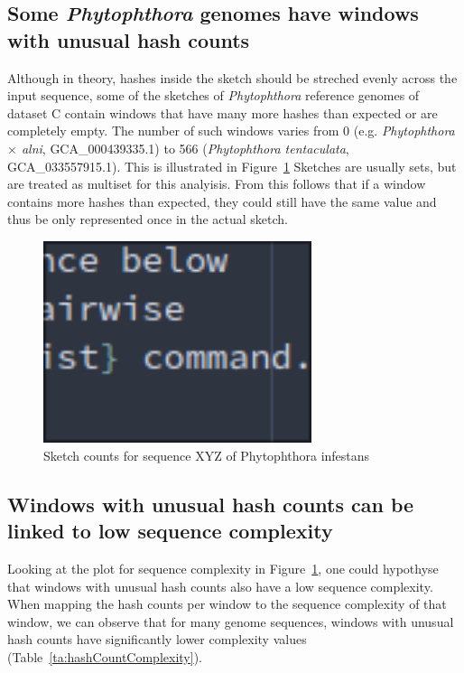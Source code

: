 \subsection*{Some \textit{Phytophthora} genomes have windows with unusual hash
counts} 

Although in theory, hashes inside the sketch should be streched evenly across
the input sequence, some of the sketches of \textit{Phytophthora} reference
genomes of dataset C contain windows that have many more hashes than expected or
are completely empty. The number of such windows varies from 0 (e.g.
\textit{Phytophthora $\times$  alni}, GCA\_000439335.1) to 566
(\textit{Phytophthora tentaculata}, GCA\_033557915.1). This is illustrated in
Figure~\ref{fig:sketchCountsOverview} 
Sketches are usually sets, but are treated as multiset for this analyisis. From
this follows that if a window contains more hashes than expected, they could
still have the same value and thus be only represented once in the actual
sketch. 

\begin{figure}
  \centering
  \includegraphics[width=0.7\textwidth]{figures/image.png}
  \caption{Sketch counts for sequence XYZ of Phytophthora infestans}
  \label{fig:sketchCountsOverview}
\end{figure}

\subsection*{Windows with unusual hash counts can be linked to low sequence complexity}
Looking at the plot for sequence complexity in
Figure~\ref{fig:sketchCountsOverview}, one could hypothyse that windows with
unusual hash counts also have a low sequence complexity. When mapping the hash
counts per window to the sequence complexity of that window, we can observe that
for many genome sequences, windows with unusual hash counts have significantly
lower complexity values (Table~\ref{ta:hashCountComplexity}).

